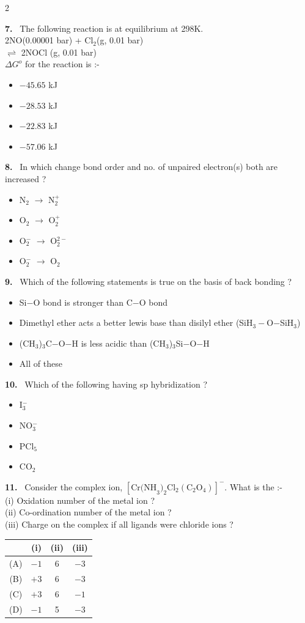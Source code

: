 \documentclass[10pt]{extarticle}
\newcommand{\qn}[1]{\par\smallskip\noindent\textbf{#1.}~}
\newenvironment{qoptions}{\begin{itemize}[leftmargin=1.8em,itemsep=1pt,topsep=2pt,label={}]}{\end{itemize}}
\newcommand{\opt}[2]{\item[(#1)] #2}
\begin{document}
\begin{multicols}{2}
\qn{7} The following reaction is at equilibrium at 298K.\\
2NO(0.00001 bar) + Cl$_2$(g, 0.01 bar)\\
\hspace*{1.2cm}$\rightleftharpoons$ 2NOCl (g, 0.01 bar)\\
$\Delta G^o$ for the reaction is :-
\begin{qoptions}
\opt{A}{$-45.65$ kJ}
\opt{B}{$-28.53$ kJ}
\opt{C}{$-22.83$ kJ}
\opt{D}{$-57.06$ kJ}
\end{qoptions}

\qn{8} In which change bond order and no. of unpaired electron(s) both are increased ?
\begin{qoptions}
\opt{A}{N$_2$ $\rightarrow$ N$_2^+$}
\opt{B}{O$_2$ $\rightarrow$ O$_2^+$}
\opt{C}{O$_2^-$ $\rightarrow$ O$_2^{2-}$}
\opt{D}{O$_2^-$ $\rightarrow$ O$_2$}
\end{qoptions}

\qn{9} Which of the following statements is true on the basis of back bonding ?
\begin{qoptions}
\opt{A}{Si$-$O bond is stronger than C$-$O bond}
\opt{B}{Dimethyl ether acts a better lewis base than disilyl ether (SiH$_3-$O$-$SiH$_3$)}
\opt{C}{(CH$_3$)$_3$C$-$O$-$H is less acidic than (CH$_3$)$_3$Si$-$O$-$H}
\opt{D}{All of these}
\end{qoptions}

\qn{10} Which of the following having sp hybridization ?
\begin{qoptions}
\opt{A}{I$_3^-$}
\opt{B}{NO$_3^-$}
\opt{C}{PCl$_5$}
\opt{D}{CO$_2$}
\end{qoptions}

\qn{11} Consider the complex ion, $[\text{Cr(NH}_3)_2\text{Cl}_2(\text{C}_2\text{O}_4)]^-$. What is the :-\\
(i) Oxidation number of the metal ion ?\\
(ii) Co-ordination number of the metal ion ?\\
(iii) Charge on the complex if all ligands were chloride ions ?\par\nobreak
\begin{center}\small
\begin{tabular}{|c|c|c|c|}
\hline
 & (i) & (ii) & (iii) \\
\hline
(A) & $-1$ & 6 & $-3$ \\
\hline
(B) & $+3$ & 6 & $-3$ \\
\hline
(C) & $+3$ & 6 & $-1$ \\
\hline
(D) & $-1$ & 5 & $-3$ \\
\hline
\end{tabular}
\end{center}


\end{multicols}
\end{document}
